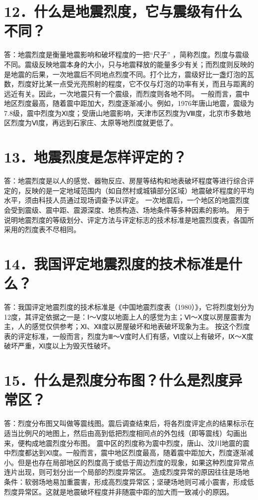 \documentclass[a4paper,10pt,english]{sphinxmanual}
\begin{document}
\section{12．什么是地震烈度，它与震级有什么不同？}
\label{\detokenize{index:id14}}
答：地震烈度是衡量地震影响和破坏程度的一把“尺子” ，简称烈度。烈度与震级不同。震级反映地震本身的大小，只与地震释放的能量多少有关；而烈度则反映的是地震的后果，一次地震后不同地点烈度不同。打个比方，震级好比一盏灯泡的瓦数，烈度好比某一点受光亮照射的程度，它不仅与灯泡的功率有关，而且与距离的远近有关。因此，一次地震只有一个震级，而烈度则各地不同。
一般而言，震中地区烈度最高，随着震中距加大，烈度逐渐减小。例如，1976年唐山地震，震级为7.8级，震中烈度为Ⅺ度；受唐山地震影响，天津市区烈度为Ⅷ度，北京市多数地区烈度为Ⅵ度，再远到石家庄、太原等地烈度就更低了。


\section{13．地震烈度是怎样评定的？}
\label{\detokenize{index:id15}}
答：地震烈度是以人的感觉、器物反应、房屋等结构和地表破坏程度等进行综合评定的，反映的是一定地域范围内（如自然村或城镇部分区域）地震破坏程度的平均水平，须由科技人员通过现场调查予以评定。
一次地震后，一个地区的地震烈度会受到震级、震中距、震源深度、地质构造、场地条件等多种因素的影响。
用于说明地震烈度的等级划分、评定方法与评定标志的技术标准是地震烈度表，各国所采用的烈度表不尽相同。


\section{14．我国评定地震烈度的技术标准是什么？}
\label{\detokenize{index:id16}}
答：我国评定地震烈度的技术标准是《中国地震烈度表（1980）》，它将烈度划分为12度，其评定依据之一是：Ⅰ～Ⅴ度以地面上人的感觉为主；Ⅵ～Ⅹ度以房屋震害为主，人的感觉仅供参考；Ⅺ、Ⅻ度以房屋破坏和地表破坏现象为主。
按这个烈度表的评定标准，一般而言，烈度为Ⅲ～Ⅴ度时人们有感，Ⅵ度以上有破坏，Ⅸ～Ⅹ度破坏严重，Ⅺ度以上为毁灭性破坏。


\section{15．什么是烈度分布图？什么是烈度异常区？}
\label{\detokenize{index:id17}}
答：烈度分布图又叫做等震线图。震后调查结束后，将各烈度评定点的结果标示在适当比例尺的地图上，然后由高到低把烈度相同点的外包线（即等震线）勾画出来，便构成地震烈度分布图。
震中区的烈度称为震中烈度，唐山、汶川地震的震中烈度都达到Ⅺ度。一般而言，震中地区烈度最高，随着震中距加大，烈度逐渐减小。但是也存在局部地区的烈度高于或低于周边烈度的现象，如果这种烈度异常点连片出现，则可划分出一个局部的烈度异常区。
造成烈度异常的原因往往是场地条件：软弱场地易加重震害，形成高烈度异常区；坚硬场地则可减小震害，形成低烈度异常区。这就是地震破坏程度并非随震中距的加大而一致减小的原因。
\end{document}
